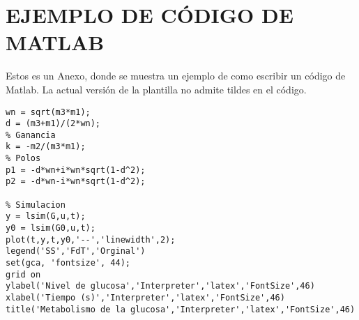 \section{EJEMPLO DE CÓDIGO DE MATLAB} \label{anex:Anexo1}
Estos es un Anexo, donde se muestra un ejemplo de como escribir un código de Matlab. La actual versión de la plantilla no admite tildes en el código.

\begin{lstlisting}[]
% Parametros de funcion de transferencia tipo
wn = sqrt(m3*m1);
d = (m3+m1)/(2*wn);
% Ganancia
k = -m2/(m3*m1);
% Polos
p1 = -d*wn+i*wn*sqrt(1-d^2);
p2 = -d*wn-i*wn*sqrt(1-d^2);

% Simulacion
y = lsim(G,u,t);
y0 = lsim(G0,u,t);
plot(t,y,t,y0,'--','linewidth',2);
legend('SS','FdT','Orginal')
set(gca, 'fontsize', 44);
grid on
ylabel('Nivel de glucosa','Interpreter','latex','FontSize',46)
xlabel('Tiempo (s)','Interpreter','latex','FontSize',46)
title('Metabolismo de la glucosa','Interpreter','latex','FontSize',46)
\end{lstlisting}
